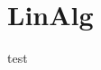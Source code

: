 \documentclass{latex4ei/latex4ei_sheet}
\begin{document}
\section*{LinAlg}
\begin{sectionbox}
test
\end{sectionbox}
\end{document}
